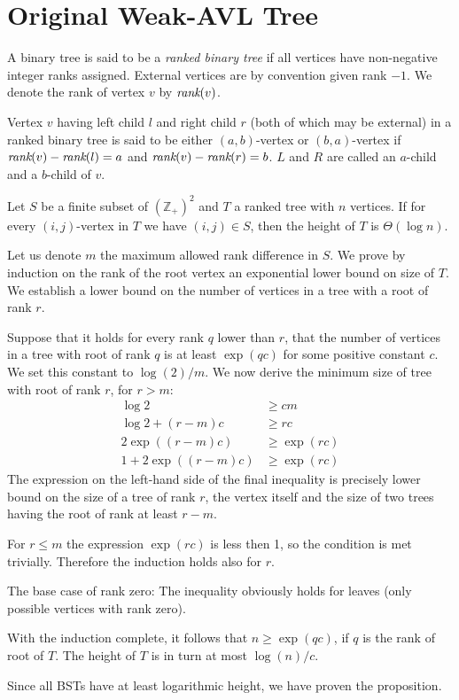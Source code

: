 

\section{Original Weak-AVL Tree}

\begin{defn}
A binary tree is said to be a {\em ranked binary tree} if all vertices have non-negative integer ranks assigned. External vertices are by convention given rank $-1$. We denote the rank of vertex $v$ by $\text{\it rank}(v)$.
\end{defn}

\begin{defn}
Vertex $v$ having left child $l$ and right child $r$ (both of which may be external) in a ranked binary tree is said to be either $(a,b)$-vertex or $(b,a)$-vertex if $\text{\it rank}(v) - \text{\it rank}(l) = a$ and $\text{\it rank}(v) - \text{\it rank}(r) = b$. $L$ and $R$ are called an $a$-child and a $b$-child of $v$.
\end{defn}

\begin{prop}
Let $S$ be a finite subset of ${(\mathbb{Z} _ +)}^2$ and $T$ a ranked tree with $n$ vertices. If for every $(i,j)$-vertex in $T$ we have $(i,j) \in S$, then the height of $T$ is $\Theta(\log n)$.
\label{thm-rbt-depth}
\end{prop}

\begin{myproof}
Let us denote $m$ the maximum allowed rank difference in $S$.
We prove by induction on the rank of the root vertex an exponential lower bound on size of $T$. We establish a lower bound on the number of vertices in a tree with a root of rank $r$. 

Suppose that it holds for every rank $q$ lower than $r$, that the number of vertices in a tree with root of rank $q$ is at least $\exp(qc)$ for some positive constant $c$. We set this constant to $\log(2)/m$.
We now derive the minimum size of tree with root of rank $r$, for $r>m$:
\begin{align*}
	\log 2            & \geq cm       \\
	\log 2 + (r-m)c   & \geq rc       \\
	2\exp((r-m)c) & \geq \exp(rc) \\
	1 + 2\exp((r-m)c) & \geq \exp(rc)
\end{align*}
The expression on the left-hand side of the final inequality is precisely lower bound on the size of a tree of rank $r$, the vertex itself and the size of two trees having the root of rank at least $r-m$.

For $r \leq m$ the expression $\exp(rc)$ is less then 1, so the condition is met trivially. Therefore the induction holds also for $r$.

The base case of rank zero: The inequality obviously holds for leaves (only possible vertices with rank zero).


With the induction complete, it follows that $n \geq \exp(qc)$, if $q$ is the rank of root of $T$. The height of $T$ is in turn at most $ \log(n)/c $. 

Since all BSTs have at least logarithmic height, we have proven the proposition.
\end{myproof}

